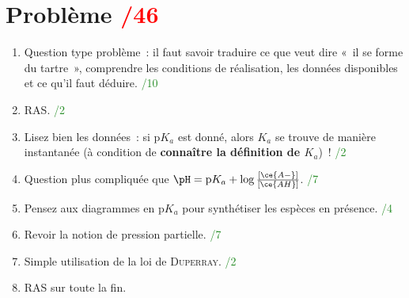 \documentclass[a4paper, 12pt, final, garamond]{book}
\begin{document}
\section{Problème \hfill \textcolor{red}{/46}}
\begin{enumerate}
  \item Question type problème~: il faut savoir traduire ce que veut dire «~il
    se forme du tartre~», comprendre les conditions de réalisation, les données
    disponibles et ce qu'il faut déduire.
    \hfill \textcolor{ForestGreen}{/10}
  \item RAS.
    \hfill \textcolor{ForestGreen}{/2}
  \item Lisez bien les données~: si $\mathrm{p}K_a$ est donné, alors $K_a$ se
    trouve de manière instantanée (à condition de \textbf{connaître la
    définition de $K_a$})~!
    \hfill \textcolor{ForestGreen}{/2}
  \item Question plus compliquée que $\pH = \mathrm{p}K_a + \log
    \frac{[\ce{A-}]}{[\ce{AH}]}$.
    \hfill \textcolor{ForestGreen}{/7}
  \item Pensez aux diagrammes en $\mathrm{p}K_a$ pour synthétiser les espèces en
    présence.
    \hfill \textcolor{ForestGreen}{/4}
  \item Revoir la notion de pression partielle.
    \hfill \textcolor{ForestGreen}{/7}
  \item Simple utilisation de la loi de \textsc{Duperray}.
    \hfill \textcolor{ForestGreen}{/2}
  \item RAS sur toute la fin.
\end{enumerate}
\end{document}
